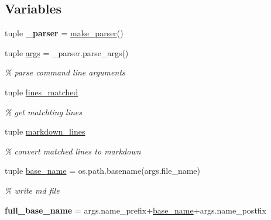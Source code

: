 \subsection*{Variables}
\begin{DoxyCompactItemize}
\item 
\hypertarget{namespacecontents_a73119bf8cf9b39a9c187a12fee719bff}{tuple {\bfseries \+\_\+parser} = \hyperlink{namespacecontents_a41e3414c2e2d8b2356559e3578a692ac}{make\+\_\+parser}()}\label{namespacecontents_a73119bf8cf9b39a9c187a12fee719bff}

\item 
\hypertarget{namespacecontents_ac60c65dad6f52b4155a46417995605ed}{tuple \hyperlink{namespacecontents_ac60c65dad6f52b4155a46417995605ed}{args} = \+\_\+parser.\+parse\+\_\+args()}\label{namespacecontents_ac60c65dad6f52b4155a46417995605ed}

\begin{DoxyCompactList}\small\item\em \% parse command line arguments \end{DoxyCompactList}\item 
tuple \hyperlink{namespacecontents_a66b7ca20229b64c2a211d046b74e1624}{lines\+\_\+matched}
\begin{DoxyCompactList}\small\item\em \% get matchting lines \end{DoxyCompactList}\item 
tuple \hyperlink{namespacecontents_af2672fb8b3e40d03ea79e4dcc65d8b39}{markdown\+\_\+lines}
\begin{DoxyCompactList}\small\item\em \% convert matched lines to markdown \end{DoxyCompactList}\item 
\hypertarget{namespacecontents_a4508f61037efb6668adbf5454154b21a}{tuple \hyperlink{namespacecontents_a4508f61037efb6668adbf5454154b21a}{base\+\_\+name} = os.\+path.\+basename(args.\+file\+\_\+name)}\label{namespacecontents_a4508f61037efb6668adbf5454154b21a}

\begin{DoxyCompactList}\small\item\em \% write md file \end{DoxyCompactList}\item 
\hypertarget{namespacecontents_a2cb57320f535e749a18d15cce05f11ea}{{\bfseries full\+\_\+base\+\_\+name} = args.\+name\+\_\+prefix+\hyperlink{namespacecontents_a4508f61037efb6668adbf5454154b21a}{base\+\_\+name}+args.\+name\+\_\+postfix}\label{namespacecontents_a2cb57320f535e749a18d15cce05f11ea}


\end{DoxyCompactItemize}
